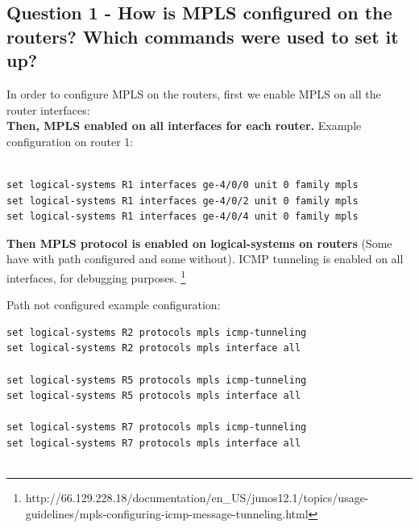 \documentclass[a4paper]{article}
\begin{document}
\subsection{Question 1 - How is MPLS configured on the routers? Which commands were used to set it up?}

In order to configure MPLS on the routers, first we enable MPLS on all the router interfaces:\\

\textbf{Then, MPLS enabled on all interfaces for each router.} Example configuration on router 1:


\begin{verbatim}

set logical-systems R1 interfaces ge-4/0/0 unit 0 family mpls
set logical-systems R1 interfaces ge-4/0/2 unit 0 family mpls
set logical-systems R1 interfaces ge-4/0/4 unit 0 family mpls
\end{verbatim}


\textbf{Then MPLS protocol is enabled on logical-systems on routers} (Some have with path configured and some without). ICMP tunneling is enabled on all interfaces, for debugging purposes. \footnote{http://66.129.228.18/documentation/en_US/junos12.1/topics/usage-guidelines/mpls-configuring-icmp-message-tunneling.html}

Path not configured example configuration:

\begin{verbatim}
set logical-systems R2 protocols mpls icmp-tunneling
set logical-systems R2 protocols mpls interface all

set logical-systems R5 protocols mpls icmp-tunneling
set logical-systems R5 protocols mpls interface all

set logical-systems R7 protocols mpls icmp-tunneling
set logical-systems R7 protocols mpls interface all  
    
\end{verbatim}
\end{document}
